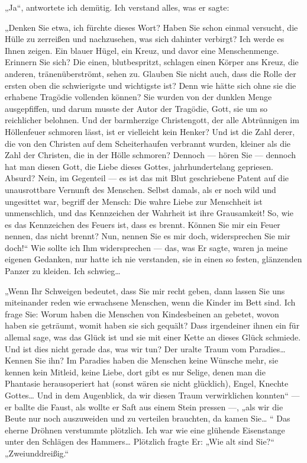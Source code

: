 „Ja“, antwortete ich demütig. Ich verstand alles, was er sagte:

„Denken Sie etwa, ich fürchte dieses Wort? Haben Sie schon einmal
versucht, die Hülle zu zerreißen und nachzusehen, was sich dahinter
verbirgt? Ich werde es Ihnen zeigen. Ein blauer Hügel, ein Kreuz,
und davor eine Menschenmenge. Erinnern Sie sich? Die einen,
blutbespritzt, schlagen einen Körper ans Kreuz, die anderen,
tränenüberströmt, sehen zu. Glauben Sie nicht auch, dass die Rolle
der ersten oben die schwierigste und wichtigste ist? Denn wie hätte
sich ohne sie die erhabene Tragödie vollenden können? Sie wurden
von der dunklen Menge ausgepfiffen, und darum musste der Autor der
Tragödie, Gott, sie um so reichlicher belohnen. Und der barmherzige
Christengott, der alle Abtrünnigen im Höllenfeuer schmoren lässt,
ist er vielleicht kein Henker? Und ist die Zahl derer, die von den
Christen auf dem Scheiterhaufen verbrannt wurden, kleiner als die
Zahl der Christen, die in der Hölle schmoren? Dennoch — hören Sie —
dennoch hat man diesen Gott, die Liebe dieses Gottes,
jahrhundertelang gepriesen. Absurd? Nein, im Gegenteil — es ist das
mit Blut geschriebene Patent auf die unausrottbare Vernunft des
Menschen. Selbst damals, als er noch wild und ungesittet war,
begriff der Mensch: Die wahre Liebe zur Menschheit ist
unmenschlich, und das Kennzeichen der Wahrheit ist ihre
Grausamkeit! So, wie es das Kennzeichen des Feuers ist, dass es
brennt. Können Sie mir ein Feuer nennen, das nicht brennt? Nun,
nennen Sie es mir doch, widersprechen Sie mir doch!“ Wie sollte ich
Ihm widersprechen — das, was Er sagte, waren ja meine eigenen
Gedanken, nur hatte ich nie verstanden, sie in einen so festen,
glänzenden Panzer zu kleiden. Ich schwieg\ldots{}

„Wenn Ihr Schweigen bedeutet, dass Sie mir recht geben, dann lassen
Sie uns miteinander reden wie erwachsene Menschen, wenn die Kinder
im Bett sind. Ich frage Sie: Worum haben die Menschen von
Kindesbeinen an gebetet, wovon haben sie geträumt, womit haben sie
sich gequält? Dass irgendeiner ihnen ein für allemal sage, was das
Glück ist und sie mit einer Kette an dieses Glück schmiede. Und ist
dies nicht gerade das, was wir
tun? Der uralte Traum vom Paradies\ldots{} Kennen Sie ihn? Im Paradies
haben die Menschen keine Wünsche mehr, sie kennen kein Mitleid,
keine Liebe, dort gibt es nur Selige, denen man die Phantasie
herausoperiert hat (sonst wären sie nicht glücklich), Engel,
Knechte Gottes\ldots{} Und in dem Augenblick, da wir diesen Traum
verwirklichen konnten“ — er ballte die Faust, als wollte er Saft
aus einem Stein pressen —, „als wir die Beute nur noch auszuweiden
und zu verteilen brauchten, da kamen Sie\ldots{} “ Das eherne Dröhnen
verstummte plötzlich. Ich war wie eine glühende Eisenstange unter
den Schlägen des Hammers\ldots{} Plötzlich fragte Er: „Wie alt sind
Sie?“ „Zweiunddreißig.“


